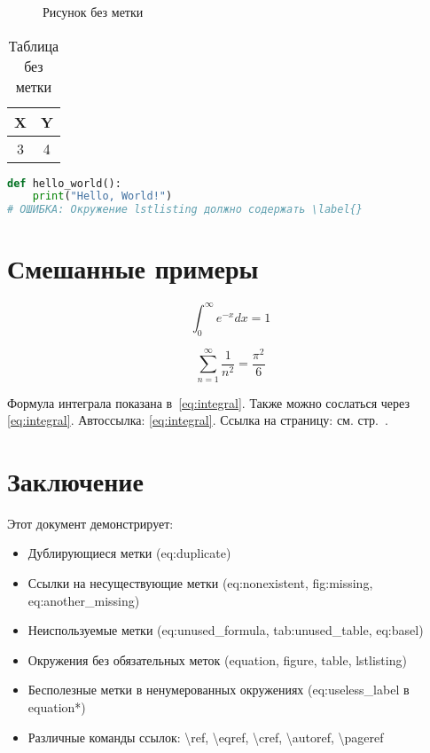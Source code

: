 \documentclass{article}
\begin{document}
\begin{figure}[h]
    \centering
    \caption{Рисунок без метки}
\end{figure}

\begin{table}[h]
    \centering
    \begin{tabular}{|c|c|}
        \hline
        X & Y \\
        \hline
        3 & 4 \\
        \hline
    \end{tabular}
    \caption{Таблица без метки}
\end{table}

\begin{lstlisting}[language=Python, caption=Код без метки]
def hello_world():
    print("Hello, World!")
# ОШИБКА: Окружение lstlisting должно содержать \label{}
\end{lstlisting}

\section{Смешанные примеры}

\begin{equation}
    \int_{0}^{\infty} e^{-x} dx = 1
    \label{eq:integral}
\end{equation}

\begin{equation}
    \sum_{n=1}^{\infty} \frac{1}{n^2} = \frac{\pi^2}{6}
    \label{eq:basel}  
\end{equation}

Формула интеграла показана в~\eqref{eq:integral}.
Также можно сослаться через \cref{eq:integral}.
Автоссылка: \autoref{eq:integral}.
Ссылка на страницу: см. стр.~\pageref{eq:integral}.

\section{Заключение}

Этот документ демонстрирует:
\begin{itemize}
    \item Дублирующиеся метки (eq:duplicate)
    \item Ссылки на несуществующие метки (eq:nonexistent, fig:missing, eq:another_missing)
    \item Неиспользуемые метки (eq:unused_formula, tab:unused_table, eq:basel)
    \item Окружения без обязательных меток (equation, figure, table, lstlisting)
    \item Бесполезные метки в ненумерованных окружениях (eq:useless_label в equation*)
    \item Различные команды ссылок: \textbackslash ref, \textbackslash eqref, \textbackslash cref, \textbackslash autoref, \textbackslash pageref
\end{itemize}
\end{document}
